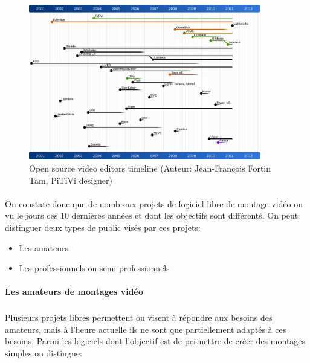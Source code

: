 \begin{figure} [h]
  \begin{center}
    \includegraphics[width=0.9\textwidth]{images/open-source-video-editor-timeline}
  \end{center} \caption{Open source video editors timeline (Auteur:
  Jean-François Fortin Tam, PiTiVi designer)} \label{Yes}
\end{figure}

\paragraph{ }

On constate donc que de nombreux projets de logiciel libre de montage
vidéo on vu le jours ces 10 dernières années et dont les objectifs
sont différents.  On peut distinguer deux types de public visés par
ces projets:

\begin {itemize}

  \item {Les amateurs}

  \item {Les professionnels ou semi professionnels}
\end {itemize}

\paragraph {Les amateurs de montages vidéo}

\subparagraph{}

Plusieurs projets libres permettent ou visent à répondre aux besoins
des amateurs, mais à l'heure actuelle ils ne sont que partiellement
adaptés à ces besoins. Parmi les logiciels dont l'objectif est de
permettre de créer des montages simples on distingue:

